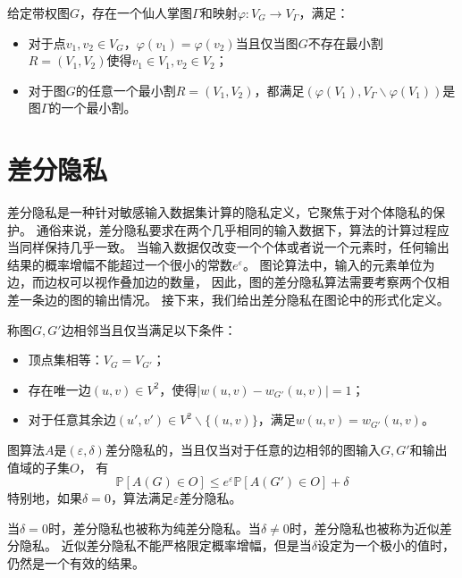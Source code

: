 \begin{theorem}[仙人掌图表示法]\cite{dinitz1976structure}
\label{cactus}
    给定带权图$G$，存在一个仙人掌图$\Gamma$和映射$\varphi:V_G\rightarrow V_\Gamma$，满足：
    \begin{itemize}
        \item 对于点$v_1,v_2\in V_G$，$\varphi(v_1)=\varphi(v_2)$当且仅当图$G$不存在最小割$R=(V_1,V_2)$使得$v_1\in V_1,v_2\in V_2$；
        \item 对于图$G$的任意一个最小割$R=(V_1,V_2)$，都满足$(\varphi(V_1),V_\Gamma\backslash\varphi(V_1))$是图$\Gamma$的一个最小割。
    \end{itemize}
\end{theorem}




\section{差分隐私}

差分隐私是一种针对敏感输入数据集计算的隐私定义，它聚焦于对个体隐私的保护。
通俗来说，差分隐私要求在两个几乎相同的输入数据下，算法的计算过程应当同样保持几乎一致。
当输入数据仅改变一个个体或者说一个元素时，任何输出结果的概率增幅不能超过一个很小的常数$e^\varepsilon$。
图论算法中，输入的元素单位为边，而边权可以视作叠加边的数量，
因此，图的差分隐私算法需要考察两个仅相差一条边的图的输出情况。
接下来，我们给出差分隐私在图论中的形式化定义。

\begin{definition}[边相邻]
    称图$G,G'$边相邻当且仅当满足以下条件：
    \begin{itemize}
        \item 顶点集相等：$V_G=V_{G'}$；
        \item 存在唯一边$(u,v)\in V^2$，使得$|w(u,v)-w_{G'}(u,v)|=1$；
        \item 对于任意其余边$(u',v')\in V^2\backslash \{(u,v)\}$，满足$w(u,v)=w_{G'}(u,v)$。
    \end{itemize}
\end{definition}

\begin{definition}[差分隐私]\cite{dwork2006differential}
    图算法$A$是$(\varepsilon,\delta)$差分隐私的，当且仅当对于任意的边相邻的图输入$G,G'$和输出值域的子集$O$，
    有
    \begin{equation*}
        \mathbb P[A(G)\in O]\leq e^\varepsilon\mathbb P[A(G')\in O]+\delta
    \end{equation*}
    特别地，如果$\delta=0$，算法满足$\varepsilon$差分隐私。
\end{definition}
当$\delta=0$时，差分隐私也被称为纯差分隐私。当$\delta\neq 0$时，差分隐私也被称为近似差分隐私。
近似差分隐私不能严格限定概率增幅，但是当$\delta$设定为一个极小的值时，仍然是一个有效的结果。

